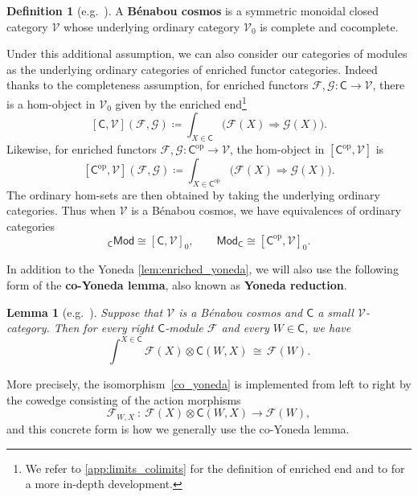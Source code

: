 \documentclass[11pt,onecolumn]{article}
\newcommand{\cV}{\mathscr{V}}
\newcommand{\cC}{\mathsf{C}}
\newcommand{\op}{\mathrm{op}}
\newcommand{\Mod}{\mathsf{Mod}}
\theoremstyle{plain}
\newtheorem{lemma}[lemma]{Lemma}
\theoremstyle{remark}
\theoremstyle{definition}
\newtheorem{definition}[definition]{Definition}
\begin{document}
\begin{definition}[{e.g.~\cite{StreetCosmoi}}]
	\label{def:benabou_cosmos}
	A \textbf{B\'enabou cosmos} is a symmetric monoidal closed category $\cV$ whose underlying ordinary category $\cV_0$ is complete and cocomplete.
\end{definition}

Under this additional assumption, we can also consider our categories of modules as the underlying ordinary categories of enriched functor categories.
Indeed thanks to the completeness assumption, for enriched functors $\mathcal{F},\mathcal{G}\colon \cC \to \cV$, there is a hom-object in $\cV_0$ given by the enriched end\footnote{We refer to \cref{app:limits_colimits} for the definition of enriched end and to \cite{Kelly} for a more in-depth development.}
\[
	[\cC, \cV](\mathcal{F}, \mathcal{G}) \coloneqq \int_{X \in \cC} \bigl(\mathcal{F}(X) \Rightarrow \mathcal{G}(X)\bigr).
\]
Likewise, for enriched functors $\mathcal{F},\mathcal{G}\colon \cC^\op \to \cV$, the hom-object in $[\cC^\op,\cV]$ is
\[
	[\cC^\op, \cV](\mathcal{F}, \mathcal{G}) \coloneqq \int_{X \in \cC^\op} \bigl(\mathcal{F}(X) \Rightarrow \mathcal{G}(X)\bigr).
\]
The ordinary hom-sets are then obtained by taking the underlying ordinary categories.
Thus when $\cV$ is a B\'enabou cosmos, we have equivalences of ordinary categories
\[
	{}_\cC\Mod \cong [\cC,\cV]_0, \qquad \Mod_\cC \cong [\cC^\op,\cV]_0.
\]

In addition to the Yoneda \cref{lem:enriched_yoneda},
we will also use the following form of the \textbf{co-Yoneda lemma}, also known as \textbf{Yoneda reduction}.

\begin{lemma}[{e.g.~\cite[Corollary~2.3]{DundasRondigsOstvaerEnrichedFunctors}}]
	\label{lem:enriched_co_yoneda}
	Suppose that $\cV$ is a B\'enabou cosmos and $\cC$ a small $\cV$-category.
	Then for every right $\cC$-module $\mathcal{F}$ and every $W \in \cC$, we have
	\begin{equation}
		\label{co_yoneda}
		\int^{X \in \cC}\mathcal{F}(X)\otimes\cC(W, X) \,\cong\, \mathcal{F}(W).
	\end{equation}
\end{lemma}

More precisely, the isomorphism~\eqref{co_yoneda} is implemented from left to right by the cowedge consisting of the action morphisms
\[
	\mathcal{F}_{W, X} \: : \:
	\mathcal{F}(X)\otimes\cC(W, X)\longrightarrow \mathcal{F}(W),
\]
and this concrete form is how we generally use the co-Yoneda lemma.
\end{document}
